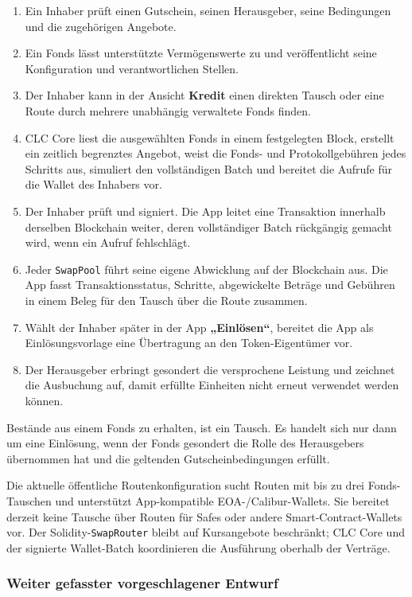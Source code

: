 \documentclass[11pt]{article}
\begin{document}
\begin{enumerate}[leftmargin=*]
\item Ein Inhaber prüft einen Gutschein, seinen Herausgeber, seine Bedingungen und die zugehörigen Angebote.
\item Ein Fonds lässt unterstützte Vermögenswerte zu und veröffentlicht seine Konfiguration und verantwortlichen Stellen.
\item Der Inhaber kann in der Ansicht \textbf{Kredit} einen direkten Tausch oder eine Route durch mehrere unabhängig verwaltete Fonds finden.
\item CLC Core liest die ausgewählten Fonds in einem festgelegten Block, erstellt ein zeitlich begrenztes Angebot, weist die Fonds- und Protokollgebühren jedes Schritts aus, simuliert den vollständigen Batch und bereitet die Aufrufe für die Wallet des Inhabers vor.
\item Der Inhaber prüft und signiert. Die App leitet eine Transaktion innerhalb derselben Blockchain weiter, deren vollständiger Batch rückgängig gemacht wird, wenn ein Aufruf fehlschlägt.
\item Jeder \texttt{SwapPool} führt seine eigene Abwicklung auf der Blockchain aus. Die App fasst Transaktionsstatus, Schritte, abgewickelte Beträge und Gebühren in einem Beleg für den Tausch über die Route zusammen.
\item Wählt der Inhaber später in der App \textbf{„Einlösen``}, bereitet die App als Einlösungsvorlage eine Übertragung an den Token-Eigentümer vor.
\item Der Herausgeber erbringt gesondert die versprochene Leistung und zeichnet die Ausbuchung auf, damit erfüllte Einheiten nicht erneut verwendet werden können.
\end{enumerate}
Bestände aus einem Fonds zu erhalten, ist ein Tausch. Es handelt sich nur dann um eine Einlösung, wenn der Fonds gesondert die Rolle des Herausgebers übernommen hat und die geltenden Gutscheinbedingungen erfüllt.

Die aktuelle öffentliche Routenkonfiguration sucht Routen mit bis zu drei Fonds-Tauschen und unterstützt App-kompatible EOA-/Calibur-Wallets. Sie bereitet derzeit keine Tausche über Routen für Safes oder andere Smart-Contract-Wallets vor. Der Solidity-\texttt{SwapRouter} bleibt auf Kursangebote beschränkt; CLC Core und der signierte Wallet-Batch koordinieren die Ausführung oberhalb der Verträge.

\subsubsection*{Weiter gefasster vorgeschlagener Entwurf}
\end{document}
